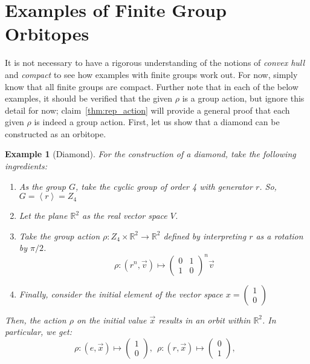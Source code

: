 \documentclass[12]{amsart}
\newtheorem{example}[theorem]{Example}
\newcommand{\gen}[1]{\left<#1\right>}
\begin{document}
\section{Examples of Finite Group Orbitopes}
\label{sec:finite_exs}
It is not necessary to have a rigorous understanding of the notions of \emph{convex hull} and \emph{compact} to see how examples with finite groups work out. For now, simply know that all finite groups are compact. Further note that in each of the below examples, it should be verified that the given $\rho$ is a group action, but ignore this detail for now; claim~\ref{thm:rep_action} will provide a general proof that each given $\rho$ is indeed a group action. First, let us show that a diamond can be constructed as an orbitope.
\begin{example}[Diamond]
	For the construction of a diamond, take the following ingredients:
	\begin{enumerate}
		\item As the group $G$, take the cyclic group of order 4  with generator $r$. So, $G = \gen{r} = Z_4$
		\item Let the plane $\mathbb{R}^2$ as the real vector space $V$.
		\item Take the group action $\rho: Z_4 \times \mathbb{R}^2 \to \mathbb{R}^2$ defined by interpreting $r$ as a rotation by $\pi/2$.
		\begin{equation*}
			\rho: (r^n,\vec{v}) \mapsto 
			\begin{pmatrix}
				0 & 1\\ 1 & 0
			\end{pmatrix}^n \vec{v}
		\end{equation*}
		\item Finally, consider the initial element of the vector space $x = \begin{pmatrix} 1 \\ 0 \end{pmatrix}$
	\end{enumerate}	
	Then, the action $\rho$ on the initial value $\vec{x}$ results in an orbit within $\mathbb{R}^2$. In particular, we get:
	\begin{equation*}
		\rho: (e, \vec{x}) \mapsto 
		\begin{pmatrix} 1 \\ 0 \end{pmatrix},\ \ 
		\rho: (r, \vec{x}) \mapsto 
		\begin{pmatrix} 0 \\ 1 \end{pmatrix},\ \ 

\end{equation*}
\end{example}
\end{document}
